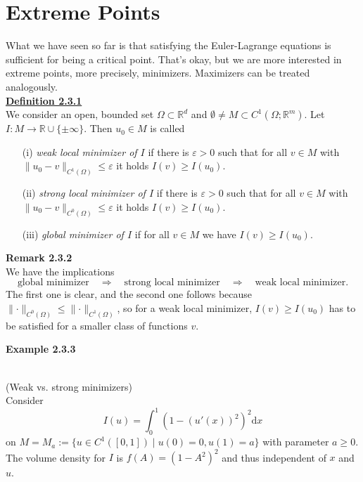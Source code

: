 \section{Extreme Points}\label{sec:mcov_chap2_sec3}
What we have seen so far is that satisfying the Euler-Lagrange equations is sufficient for being a critical point. That's okay, but we are more interested in extreme points, more precisely, minimizers. Maximizers can be treated analogously.\\[11pt]

\textbf{\underline{Definition 2.3.1}}\\
We consider an open, bounded set $\Omega\subset\mathbb{R}^d$ and $\emptyset\ne M\subset C^1(\Omega;\mathbb{R}^m)$. Let $I:M\longrightarrow\mathbb{R}\cup\{\pm\infty\}$. Then $u_0\in M$ is called
\begin{itemize}
	\item[(i)] \textit{weak local minimizer of $I$} if there is $\varepsilon>0$ such that for all $v\in M$ with $\lVert u_0-v\rVert_{C^1(\Omega)}\leq\varepsilon$ it holds $I(v)\geq I(u_0)$.
	\item[(ii)] \textit{strong local minimizer of $I$} if there is $\varepsilon>0$ such that for all $v\in M$ with $\lVert u_0-v\rVert_{C^0(\Omega)}\leq\varepsilon$ it holds $I(v)\geq I(u_0)$.
	\item[(iii)] \textit{global minimizer of $I$} if for all $v\in M$ we have $I(v)\geq I(u_0)$.\\[11pt]
\end{itemize}

\textbf{Remark 2.3.2}\\
We have the implications
\[\text{global minimizer}\quad\Rightarrow\quad\text{strong local minimizer}\quad\Rightarrow\quad\text{weak local minimizer}.\]
The first one is clear, and the second one follows because $\lVert\cdot\rVert_{C^0(\Omega)}\leq\lVert\cdot\rVert_{C^1(\Omega)}$, so for a weak local minimizer, $I(v)\geq I(u_0)$ has to be satisfied for a smaller class of functions $v$.\newpage

\hypertarget{example_2_3_3}{\textbf{Example 2.3.3}}\\
(Weak vs. strong minimizers)\\
Consider
\[I(u)=\int_0^1{(1-(u'(x))^2)^2\mathrm{d}x}\]
on $M=M_a:=\{u\in C^1([0,1])\mid u(0)=0,u(1)=a\}$ with parameter $a\geq0$. The volume density for $I$ is $f(A)=(1-A^2)^2$ and thus independent of $x$ and $u$.


